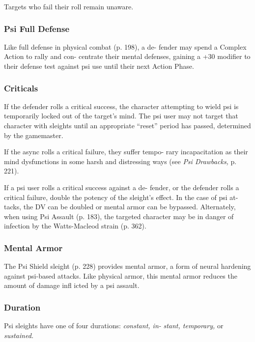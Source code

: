 Targets who fail their roll remain unaware.

\subsubsection{Psi Full Defense}

Like full defense in physical combat (p. 198), a de-
fender may spend a Complex Action to rally and con-
centrate their mental defenses, gaining a +30 modifier 
to their defense test against psi use until their next 
Action Phase.

\subsubsection{Criticals}

If the defender rolls a critical success, the character 
attempting to wield psi is temporarily locked out of 
the target's mind. The psi user may not target that 
character with sleights until an appropriate ``reset'' 
period has passed, determined by the gamemaster.

If the async rolls a critical failure, they suffer tempo-
rary incapacitation as their mind dysfunctions in some 
harsh and distressing ways (see \textit{Psi Drawbacks,} p. 221).

If a psi user rolls a critical success against a de-
fender, or the defender rolls a critical failure, double 
the potency of the sleight's effect. In the case of psi at-
tacks, the DV can be doubled or mental armor can be 
bypassed. Alternately, when using Psi Assault (p. 183), 
the targeted character may be in danger of infection 
by the Watts-Macleod strain (p. 362).

\subsubsection{Mental Armor}

The Psi Shield sleight (p. 228) provides mental armor, 
a form of neural hardening against psi-based attacks. 
Like physical armor, this mental armor reduces the 
amount of damage infl icted by a psi assault.

\subsubsection{Duration}

Psi sleights have one of four durations: \textit{constant, in-}
\textit{stant, temporary,} or \textit{sustained.}

